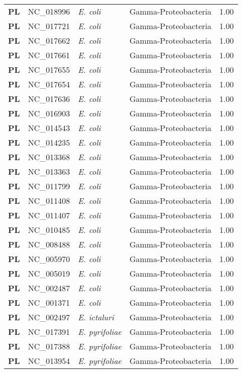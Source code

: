 \begin{adjustwidth}{-3cm}{2cm}
{\begin{supertabular}{>{\bfseries}l|p{0.1\textwidth}p{0.14\textwidth}l|l}
PL & NC\_018996 & \textit{E. coli} & Gamma-Proteobacteria & 1.00\\
PL & NC\_017721 & \textit{E. coli} & Gamma-Proteobacteria & 1.00\\
PL & NC\_017662 & \textit{E. coli} & Gamma-Proteobacteria & 1.00\\
PL & NC\_017661 & \textit{E. coli} & Gamma-Proteobacteria & 1.00\\
PL & NC\_017655 & \textit{E. coli} & Gamma-Proteobacteria & 1.00\\
PL & NC\_017654 & \textit{E. coli} & Gamma-Proteobacteria & 1.00\\
PL & NC\_017636 & \textit{E. coli} & Gamma-Proteobacteria & 1.00\\
PL & NC\_016903 & \textit{E. coli} & Gamma-Proteobacteria & 1.00\\
PL & NC\_014543 & \textit{E. coli} & Gamma-Proteobacteria & 1.00\\
PL & NC\_014235 & \textit{E. coli} & Gamma-Proteobacteria & 1.00\\
PL & NC\_013368 & \textit{E. coli} & Gamma-Proteobacteria & 1.00\\
PL & NC\_013363 & \textit{E. coli} & Gamma-Proteobacteria & 1.00\\
PL & NC\_011799 & \textit{E. coli} & Gamma-Proteobacteria & 1.00\\
PL & NC\_011408 & \textit{E. coli} & Gamma-Proteobacteria & 1.00\\
PL & NC\_011407 & \textit{E. coli} & Gamma-Proteobacteria & 1.00\\
PL & NC\_010485 & \textit{E. coli} & Gamma-Proteobacteria & 1.00\\
PL & NC\_008488 & \textit{E. coli} & Gamma-Proteobacteria & 1.00\\
PL & NC\_005970 & \textit{E. coli} & Gamma-Proteobacteria & 1.00\\
PL & NC\_005019 & \textit{E. coli} & Gamma-Proteobacteria & 1.00\\
PL & NC\_002487 & \textit{E. coli} & Gamma-Proteobacteria & 1.00\\
PL & NC\_001371 & \textit{E. coli} & Gamma-Proteobacteria & 1.00\\
PL & NC\_002497 & \textit{E. ictaluri} & Gamma-Proteobacteria & 1.00\\
PL & NC\_017391 & \textit{E. pyrifoliae} & Gamma-Proteobacteria & 1.00\\
PL & NC\_017388 & \textit{E. pyrifoliae} & Gamma-Proteobacteria & 1.00\\
PL & NC\_013954 & \textit{E. pyrifoliae} & Gamma-Proteobacteria & 1.00\\

\end{supertabular}}
\end{adjustwidth}
